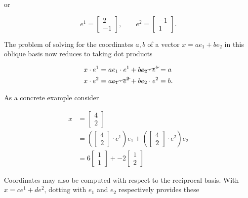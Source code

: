 or

\begin{equation}\label{eqn:grahamSchmidtLorentz:190}
e^1 =
\begin{bmatrix}
2 \\
-1
\end{bmatrix}, \qquad
e^2 =
\begin{bmatrix}
-1 \\
1
\end{bmatrix}.
\end{equation}

The problem of solving for the coordinates $a,b$ of a vector $x = a e_1 + b e_2$ in this oblique basis now reduces to taking dot products

\begin{align}\label{eqn:grahamSchmidtLorentz:920}
x \cdot e^1 &= a e_1 \cdot e^1 + b \cancel{e_2 \cdot e^1} = a \\
x \cdot e^2 &= a \cancel{e_1 \cdot e^2} + b e_2 \cdot e^2 = b.
\end{align}

As a concrete example consider

\begin{equation}\label{eqn:grahamSchmidtLorentz:230}
\begin{aligned}
x &=
\begin{bmatrix}
4 \\
2
\end{bmatrix}  \\
&=
\left(
\begin{bmatrix}
4 \\
2
\end{bmatrix}
\cdot e^1
\right)
e_1
+
\left(
\begin{bmatrix}
4 \\
2
\end{bmatrix}
\cdot e^2
\right)
e_2 \\
&= 6
\begin{bmatrix}
1 \\
1
\end{bmatrix}
+
-2
\begin{bmatrix}
1 \\
2
\end{bmatrix}
\end{aligned}
\end{equation}

Coordinates may also be computed with respect to the reciprocal basis.  With $x = c e^1 + d e^2$, dotting with $e_1$ and $e_2$ respectively provides these

